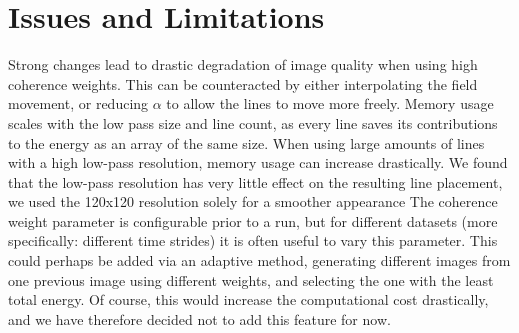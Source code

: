 \section{Issues and Limitations}
Strong changes lead to drastic degradation of image quality when using high coherence weights.
This can be counteracted by either interpolating the field movement, or reducing $\alpha$ to allow the lines to move more freely.
Memory usage scales with the low pass size and line count, as every line saves its contributions to the energy as an array of the same size.
When using large amounts of lines with a high low-pass resolution, memory usage can increase drastically.
We found that the low-pass resolution has very little effect on the resulting line placement, we used the 120x120 resolution solely for a smoother appearance
The coherence weight parameter is configurable prior to a run,
but for different datasets (more specifically: different time strides) it is often useful to vary this parameter.
This could perhaps be added via an adaptive method,
generating different images from one previous image using different weights,
and selecting the one with the least total energy.
Of course, this would increase the computational cost drastically,
and we have therefore decided not to add this feature for now.


